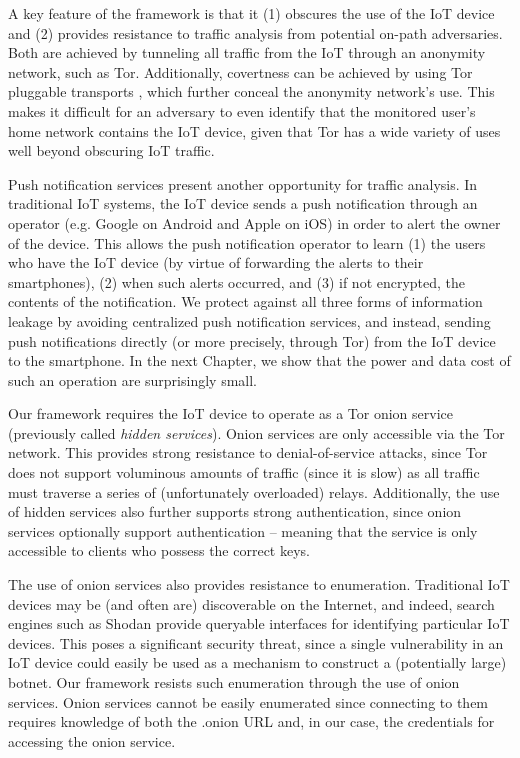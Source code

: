  A key feature of the framework is that it (1) obscures the use of the IoT device and (2) provides resistance to traffic analysis from potential on-path adversaries. Both are achieved by tunneling all traffic from the IoT through an anonymity network, such as Tor. Additionally, covertness can be achieved by using Tor pluggable transports \cite{shahbar2015traffic}, which further conceal the anonymity network's use. This makes it difficult for an adversary to even identify that the monitored user's home network contains the IoT device, given that Tor has a wide variety of uses well beyond obscuring IoT traffic.

Push notification services present another opportunity for traffic analysis. In traditional IoT systems, the IoT device sends a push notification through an operator (e.g. Google on Android and Apple on iOS) in order to alert the owner of the device. This allows the push notification operator to learn (1) the users who have the IoT device (by virtue of forwarding the alerts to their smartphones), (2) when such alerts occurred, and (3) if not encrypted, the contents of the notification. We protect against all three forms of information leakage by avoiding centralized push notification services, and instead, sending push notifications directly (or more precisely, through Tor) from the IoT device to the smartphone. In the next Chapter, we show that the power and data cost of such an operation are surprisingly small.

 Our framework requires the IoT device to operate as a Tor onion service (previously called \textit{hidden services}). Onion services are only accessible via the Tor network. This provides strong resistance to denial-of-service attacks, since Tor does not support voluminous amounts of traffic (since it is slow) as all traffic must traverse a series of (unfortunately overloaded) relays. Additionally, the use of hidden services also further supports strong authentication, since onion services optionally support authentication -- meaning that the service is only accessible to clients who possess the correct keys.

 The use of onion services also provides resistance to enumeration. Traditional IoT devices may be (and often are) discoverable on the Internet, and indeed, search engines such as Shodan \cite{matherly2015complete} provide queryable interfaces for identifying particular IoT devices. This poses a significant security threat, since a single vulnerability in an IoT device could easily be used as a mechanism to construct a (potentially large) botnet. Our framework resists such enumeration through the use of onion services. Onion services cannot be easily enumerated \cite{winter2018tor} \cite{chaabane2010digging} since connecting to them requires knowledge of both the .onion URL and, in our case, the credentials for accessing the onion service.